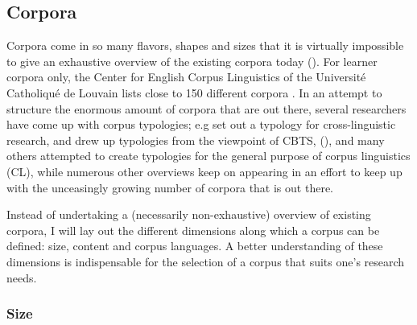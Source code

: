 \subsection{\label{sec:2.2.1}  Corpora}

Corpora come in so many flavors, shapes and sizes that it is virtually impossible to give an exhaustive overview of the existing corpora today (\citealt{mcenery_corpus_2012}). For learner corpora only, the Center for English Corpus Linguistics of the Université Catholiqué de Louvain lists close to 150 different corpora \citep{hiligsmann_learner_2015}. In an attempt to structure the enormous amount of corpora that are out there, several researchers have come up with corpus typologies; e.g \citep{johansson_role_1998} set out a typology for cross-linguistic research, \citep{baker_corpora_1995} and \citep{laviosa_corpus-based_2002} drew up typologies from the viewpoint of CBTS, (\citealt{brown_corpora_2006}), \citep{mccarthy_what_2010} and many others attempted to create typologies for the general purpose of corpus linguistics (CL), while numerous other overviews keep on appearing in an effort to keep up with the unceasingly growing number of corpora that is out there.



Instead of undertaking a (necessarily non-exhaustive) overview of existing corpora, I will lay out the different dimensions along which a corpus can be defined: size, content and corpus languages. A better understanding of these dimensions is indispensable for the selection of a corpus that suits one’s research needs.


\subsubsection{\label{sec:2.2.1.1}  Size}

